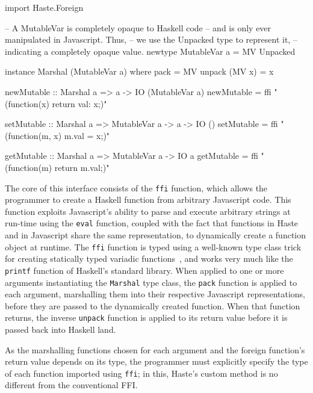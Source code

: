 \documentclass[preprint]{sigplanconf}
\begin{document}
\begin{listingfloat}
\begin{code}
import Haste.Foreign

-- A MutableVar is completely opaque to Haskell code
-- and is only ever manipulated in Javascript. Thus,
-- we use the Unpacked type to represent it,
-- indicating a completely opaque value.
newtype MutableVar a = MV Unpacked

instance Marshal (MutableVar a) where
  pack          = MV
  unpack (MV x) = x

newMutable :: Marshal a => a -> IO (MutableVar a)
newMutable = ffi "(function(x) {return {val: x};})"

setMutable :: Marshal a => MutableVar a -> a -> IO ()
setMutable = ffi "(function(m, x) {m.val = x;})"

getMutable :: Marshal a => MutableVar a -> IO a
getMutable = ffi "(function(m) {return m.val;})"
\end{code}
\caption{Mutable variables with \lstinline!Haste.Foreign!}
\label{lst:ffi}
\end{listingfloat}

The core of this interface consists of the \lstinline!ffi! function, which
allows the programmer to create a Haskell function from arbitrary Javascript
code. This function exploits Javascript's ability to parse and execute
arbitrary strings at run-time using the \lstinline!eval! function, coupled with
the fact that functions in Haste and in Javascript share the same
representation, to dynamically create a function object at runtime.
The \lstinline!ffi! function is typed using a well-known type class trick for
creating statically typed variadic functions\ \cite{printf}, and works very
much like the \lstinline!printf! function of Haskell's standard library.
When applied to one or more arguments instantiating the \lstinline!Marshal!
type class, the \lstinline!pack! function is applied to each argument,
marshalling them into their respective Javascript representations, before they
are passed to the dynamically created function. When that function returns,
the inverse \lstinline!unpack! function is applied to its return value before
it is passed back into Haskell land.

As the marshalling functions chosen for each argument and the foreign
function's return value depends on its type, the programmer must explicitly
specify the type of each function imported using \lstinline!ffi!; in this,
Haste's custom method is no different from the conventional FFI.
\end{document}
